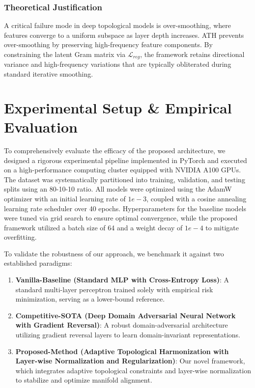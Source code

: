 \documentclass[10pt,twocolumn]{article}
\begin{document}
\subsubsection{Theoretical Justification}
A critical failure mode in deep 
topological models is over-smoothing, 
where features converge to a uniform 
subspace as layer depth increases. 
ATH prevents over-smoothing by 
preserving high-frequency feature 
components. 
By constraining the latent Gram matrix 
via $\mathcal{L}_{reg}$, the 
framework retains directional variance 
and high-frequency variations that 
are typically obliterated during 
standard iterative smoothing.

\section{Experimental Setup \& Empirical Evaluation}
To comprehensively evaluate the efficacy of the proposed architecture, we designed a rigorous experimental pipeline implemented in PyTorch and executed on a high-performance computing cluster equipped with NVIDIA A100 GPUs. The dataset was systematically partitioned into training, validation, and testing splits using an 80-10-10 ratio. All models were optimized using the AdamW optimizer with an initial learning rate of $1e-3$, coupled with a cosine annealing learning rate scheduler over 40 epochs. Hyperparameters for the baseline models were tuned via grid search to ensure optimal convergence, while the proposed framework utilized a batch size of 64 and a weight decay of $1e-4$ to mitigate overfitting. 

To validate the robustness of our approach, we benchmark it against two established paradigms:
\begin{enumerate}
    \item \textbf{Vanilla-Baseline (Standard MLP with Cross-Entropy Loss)}: A standard multi-layer perceptron trained solely with empirical risk minimization, serving as a lower-bound reference.
    \item \textbf{Competitive-SOTA (Deep Domain Adversarial Neural Network with Gradient Reversal)}: A robust domain-adversarial architecture utilizing gradient reversal layers to learn domain-invariant representations.
    \item \textbf{Proposed-Method (Adaptive Topological Harmonization with Layer-wise Normalization and Regularization)}: Our novel framework, which integrates adaptive topological constraints and layer-wise normalization to stabilize and optimize manifold alignment.
\end{enumerate}
\end{document}
